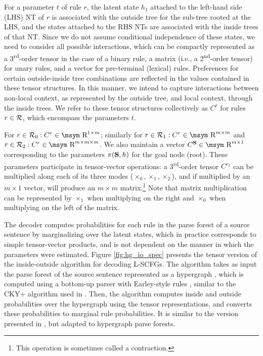 \documentclass[11pt]{article}
\newcommand{\ts}{\textsuperscript}
\newcommand{\rules}{{\cal R}}
\newcommand{\bS}{{\bf S}}
\newcommand{\reals}{\mbox{\msym R}}
\begin{document}
For a parameter $t$ of rule $r$, the latent state $h_1$ attached to the left-hand side (LHS) NT of $r$ is associated with the outside tree for the sub-tree rooted at the LHS, and the states attached to the RHS NTs are associated with the inside trees of that NT.    
Since we do not assume conditional independence of these states, we need to consider all possible interactions, which can be compactly represented as a 3\ts{rd}-order tensor in the case of a binary rule, a matrix (i.e., a 2\ts{nd}-order tensor) for unary rules, and a vector for pre-terminal (lexical) rules.  
Preferences for certain outside-inside tree combinations are reflected in the values contained in these tensor structures.  
In this manner, we intend to capture interactions between non-local context, as represented by the outside tree, and local context, through the inside trees. 
We refer to these tensor structures collectively as $C^r$ for rules $r \in \rules$, which encompass the parameters $t$.  

For $r \in \rules_0: C^r \in \reals^{1 \times m}$; similarly for $r \in \rules_1: C^r \in \reals^{m \times m}$ and $r \in \rules_2: C^r \in \reals^{m \times m \times m}$.
We also maintain a vector $C^\bS \in \reals^{m \times 1}$ corresponding to the parameters $\pi(\bS, h)$ for the goal node (root).   
These parameters participate in tensor-vector operations: a 3\ts{rd}-order tensor $C^{r_2}$ can be multiplied along each of its three modes ($\times_0, \times_1, \times_2$), and if multiplied by an $m \times 1$ vector, will produce an $m \times m$ matrix.\footnote{This operation is sometimes called a contraction.}
Note that matrix multiplication can be represented by $\times_1$ when multiplying on the right and $\times_0$ when multiplying on the left of the matrix.  

The decoder computes probabilities for each rule in the parse forest of a source sentence by marginalizing over the latent states, which in practice corresponds to simple tensor-vector products, and is not dependent on the manner in which the parameters were estimated. 
Figure \ref{fig:hg_io_spec} presents the tensor version of the inside-outside algorithm for decoding L-SCFGs. 
The algorithm takes as input the parse forest of the source sentence represented as a hypergraph \cite{Klein2001}, which is computed using a bottom-up parser with Earley-style rules \cite{Chappelier1998}, similar to the CKY+ algorithm used in .  
Then, the algorithm computes inside and outside probabilities over the hypergraph using the tensor representations, and converts these probabilities to marginal rule probabilities.  
It is similar to the version presented in , but adapted to hypergraph parse forests. 
 
\end{document}
